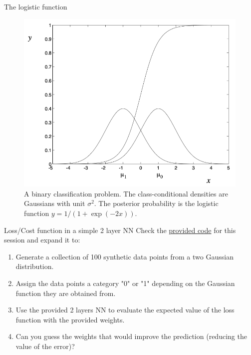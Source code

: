 \documentclass{beamer}
\begin{document}
\begin{frame}{The logistic function}
    \begin{figure}
        \includegraphics[width=0.6\linewidth]{logistic}
        \caption{A binary classification problem. The class-conditional densities are Gaussians with unit $\sigma^2$. The posterior probability is the logistic function $y=1/(1+\exp{(-2x)})$\cite{jordan_why_1995}.}
        \label{Fig:TrainingDart}
    \end{figure}
\end{frame}


\begin{frame}
    \begin{Exercise}{Loss/Cost function in a simple 2 layer NN}
        \label{Ex:2layer}
        Check the \href{https://github.com/Biocomputing-Teaching/Data-Science-with-Python/blob/main/code/UNIT9-Neural-Networks.ipynb}{provided code} for this session and expand it to:
        \begin{enumerate}
            \item Generate a collection of 100 synthetic data points from a two Gaussian distribution.
            \item Assign the data points a category "0" or "1" depending on the Gaussian function they are obtained from.
            \item Use the provided 2 layers NN to evaluate the expected value of the loss function with the provided weights.
            \item Can you guess the weights that would improve the prediction (reducing the value of the error)?
        \end{enumerate}
    \end{Exercise}
\end{frame}
\end{document}
